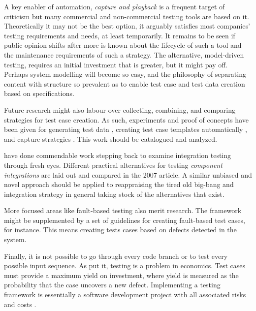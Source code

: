 \documentclass[12pt,a4paper,oneside,pdftex]{report}
\begin{document}
{%
A key enabler of automation, \emph{capture and playback} is a frequent target of criticism but many commercial and non-commercial testing tools are based on it. Theoretically it may not be the best option, it arguably satisfies most companies' testing requirements and needs, at least temporarily. It remains to be seen if public opinion shifts after more is known about the lifecycle of such a tool and the maintenance requirements of such a strategy. The alternative, model-driven testing, requires an initial investment that is greater, but it might pay off. Perhaps system modelling will become so easy, and the philosophy of separating content with structure so prevalent as to enable test case and test data creation based on specifications.

Future research might also labour over collecting, combining, and comparing strategies for test case creation. As such, experiments and proof of concepts have been given for generating test data \citep{linnenkugel1990test}, creating test case templates automatically \citep{bai2005WSDL}, and capture strategies \citep{meszaros2003agile}. This work should be catalogued and analyzed.

\citet{rehman2007testing} have done commendable work stepping back to examine integration testing through fresh eyes. Different practical alternatives for testing \emph{component integrations} are laid out and compared in the 2007 article. A similar unbiased and novel approach should be applied to reappraising the tired old big-bang and integration strategy in general taking stock of the alternatives that exist.

More focused areas like fault-based testing also merit research. The framework might be supplemented by a set of guidelines for creating fault-based test cases, for instance. This means creating tests cases based on defects detected in the system.

Finally, it is not possible to go through every code branch or to test every possible input sequence. As \citet{myers1976software} put it, testing is a problem in economics. Test cases must provide a maximum yield on investment, where yield is measured as the probability that the case uncovers a new defect. \citep{myers1976software} Implementing a testing framework is essentially a software development project with all associated risks and costs \citep{kaner1997pitfalls}. 


}
\end{document}
